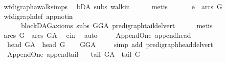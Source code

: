 \begin{isabellebody}
\ wf{\isacharunderscore}{\kern0pt}digraph{\isachardot}{\kern0pt}awalk{\isacharunderscore}{\kern0pt}simps{\isacharparenleft}{\kern0pt}{}{\isacharparenright}{\kern0pt}\isanewline
\ \ bD{\isacharunderscore}{\kern0pt}A\ subs\ walk{\isacharunderscore}{\kern0pt}in\isanewline
\ \ \ \ \isamarkupfalse%
\ metis\ \isanewline
\ \ \isamarkupfalse%
\ \isamarkupfalse%
\ {\isachardoublequoteopen}e\ {\isasymnotin}\ arcs\ G{\isachardoublequoteclose}\ \isamarkupfalse%
\ wf{\isacharunderscore}{\kern0pt}digraph{\isacharunderscore}{\kern0pt}def\ app{\isacharunderscore}{\kern0pt}notin\ \isanewline
\ \ \ \ \ \ blockDAG{\isacharunderscore}{\kern0pt}axioms\ subs\ GG{\isacharunderscore}{\kern0pt}A\ pre{\isacharunderscore}{\kern0pt}digraph{\isachardot}{\kern0pt}tail{\isacharunderscore}{\kern0pt}del{\isacharunderscore}{\kern0pt}vert\isanewline
\ \ \ \ \isamarkupfalse%
\ metis\ \isanewline
\ \ \isamarkupfalse%
\ \isamarkupfalse%
\ {\isachardoublequoteopen}arcs\ G\ {\isasymnoteq}\ arcs\ G{\isacharunderscore}{\kern0pt}A{\isachardoublequoteclose}\ \isamarkupfalse%
\ e{\isacharunderscore}{\kern0pt}in\ \isamarkupfalse%
\ auto\isanewline
{}\isamarkupfalse%
%
\endisatagproof
{\isafoldproof}%
%
\isadelimproof
\isanewline
%
\endisadelimproof
\ \ \isanewline
{}\isamarkupfalse%
\ {\isacharparenleft}{\kern0pt}\ Append{\isacharunderscore}{\kern0pt}One{\isacharparenright}{\kern0pt}\ append{\isacharunderscore}{\kern0pt}head{\isacharcolon}{\kern0pt}\ \isanewline
\ \ {\isachardoublequoteopen}head\ G{\isacharunderscore}{\kern0pt}A\ {\isacharequal}{\kern0pt}\ head\ G{\isachardoublequoteclose}\isanewline
%
\isadelimproof
\ \ %
\endisadelimproof
%
\isatagproof
{}\isamarkupfalse%
\ GG{\isacharunderscore}{\kern0pt}A\ \isanewline
\ \ \isamarkupfalse%
\ {\isacharparenleft}{\kern0pt}simp\ add{\isacharcolon}{\kern0pt}\ pre{\isacharunderscore}{\kern0pt}digraph{\isachardot}{\kern0pt}head{\isacharunderscore}{\kern0pt}del{\isacharunderscore}{\kern0pt}vert{\isacharparenright}{\kern0pt}%
\endisatagproof
{\isafoldproof}%
%
\isadelimproof
\ \isanewline
%
\endisadelimproof
\isanewline
{}\isamarkupfalse%
\ {\isacharparenleft}{\kern0pt}\ Append{\isacharunderscore}{\kern0pt}One{\isacharparenright}{\kern0pt}\ append{\isacharunderscore}{\kern0pt}tail{\isacharcolon}{\kern0pt}\ \isanewline
\ \ {\isachardoublequoteopen}tail\ G{\isacharunderscore}{\kern0pt}A\ {\isacharequal}{\kern0pt}\ tail\ G{\isachardoublequoteclose}\isanewline

\end{isabellebody}
